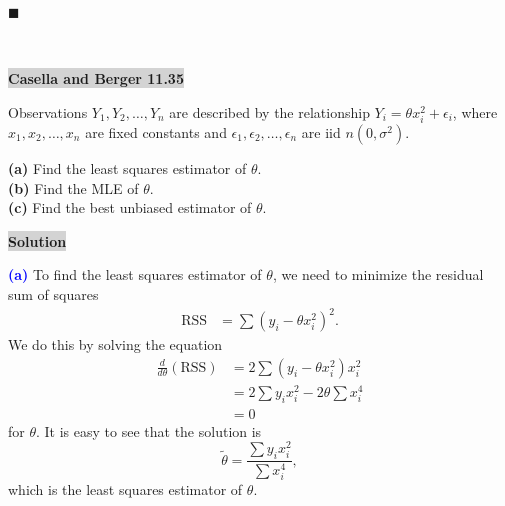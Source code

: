 \documentclass[12pt]{article}
\newcommand{\mybox}{%
    \collectbox{%
        \setlength{\fboxsep}{2pt}%
        \fbox{\BOXCONTENT}%
    }%
}
\begin{document}
\hfill$\blacksquare$


\vfill
\begin{center}
\end{center}
\begin{center}
\vspace{-0.6cm}
\hrulefill \\
\vspace{-0.7cm}
\hrulefill
\end{center}

\pagebreak

\noindent\mybox{\colorbox{lightgray}{\textbf{Casella and Berger 11.35}}}\hspace{3mm}\hrulefill 

\noindent Observations $Y_1, Y_2, \ldots, Y_n$ are described by the relationship $Y_i = \theta x_i^2 + \epsilon_i$, where $x_1, x_2, \ldots, x_n$ are fixed constants and $\epsilon_1, \epsilon_2, \ldots, \epsilon_n$ are iid $n(0, \sigma^2)$.
\begin{flushleft}
\textbf{(a)} Find the least squares estimator of $\theta$. \\
\textbf{(b)} Find the MLE of $\theta$. \\
\textbf{(c)} Find the best unbiased estimator of $\theta$.
\end{flushleft}

\noindent\mybox{\colorbox{lightgray}{\textbf{Solution}}} \hspace{3mm}\hrulefill

\noindent \textcolor{blue}{\textbf{(a)}} To find the least squares estimator of $\theta$, we need to minimize the residual sum of squares 
\begin{align}
\text{RSS} &= \sum (y_i - \theta x_i^2)^2.
\end{align}
We do this by solving the equation 
\begin{align}
\frac{d}{d\theta}\left(\text{RSS}\right) &= 2\sum (y_i - \theta x_i^2)x_i^2 \\
&= 2\sum y_ix_i^2 - 2\theta\sum x_i^4 \\
&=0
\end{align}
for $\theta$. It is easy to see that the solution is $$\tilde{\theta} = \frac{\sum y_ix_i^2}{\sum x_i^4},$$ which is the least squares estimator of $\theta$.

\vspace{3mm}
\end{document}
